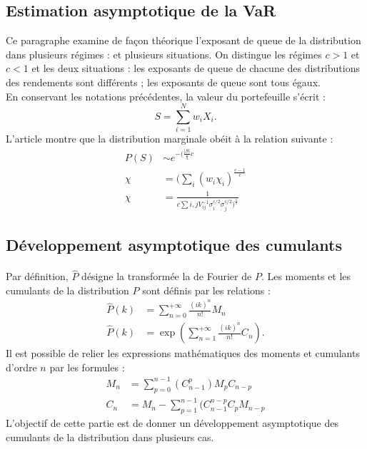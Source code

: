\documentclass{article}
\begin{document}
  \subsection{Estimation asymptotique de la VaR}
   Ce paragraphe examine de façon théorique l'exposant de queue de la distribution dans plusieurs régimes : et plusieurs situations. On distingue les régimes $ c>1 $ et $ c<1 $ et les deux situations : les exposants de queue de chacune des distributions des rendements sont différents ; les exposants de queue sont tous égaux.\\
 En conservant les notations précédentes, la valeur du portefeuille s'écrit :
 \begin{equation}
 S=\sum ^{N}_{i=1}w_{i}X_{i}.
 \end{equation}
    L'article montre que la distribution marginale obéit à la relation suivante : 
    \begin{align}
	P(S) &\sim e^{-(\frac{\vert S \vert}{\chi}c}\\
    \chi &= (\sum _{i}(w_{i}\chi _{i})^{\frac{c-1}{c}}\\
    \chi &= \frac{1}{c\sum i,jV_{ij}^{-1}\sigma_{i}^{c/2}\sigma ^{c/2}_{j})^{\frac{1}{c}}}
    \end{align}
 \subsection{Développement asymptotique des cumulants}
\paragraph{}         
       Par définition, $ \widehat{P} $ désigne la transformée la de Fourier de $P$. Les moments et les cumulants de la distribution $P$ sont définis par les relations :
       \begin{align}
       \widehat{P}(k) &= \sum _{n=0}^{+\infty }\frac{(ik)^{n}}{n!}M_{n}\\
       \widehat{P}(k) &= \exp(\sum _{n=1}^{+\infty }\frac{(ik)^{n}}{n!}C_{n}).
       \end{align}
        Il est possible de relier les expressions mathématiques des moments et cumulants d'ordre $n$ par les formules :
    \begin{align}
    M_{n} &= \sum ^{n-1}_{p=0}(C^{p}_{n-1})M_{p}C_{n-p}\\
    C_{n} &= M_{n}-\sum ^{n-1}_{p=1}(C_{n-1}^{n-p}C_{p}M_{n-p}
    \end{align}
     L'objectif de cette partie est de donner un développement asymptotique des cumulants de la distribution dans plusieurs cas.
\end{document}
